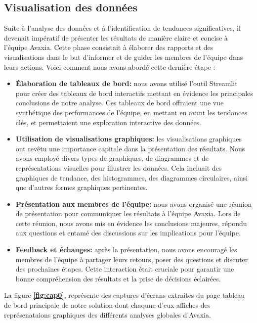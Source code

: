         \subsection{Visualisation des données}
        \par Suite à l'analyse des données et à l'identification de tendances significatives, il devenait impératif de présenter les résultats de manière claire et concise à l'équipe Avaxia. Cette phase consistait à élaborer des rapports et des visualisations dans le but d'informer et de guider les membres de l'équipe dans leurs actions. Voici comment nous avons abordé cette dernière étape :
        \begin{itemize}
            \item \textbf{Élaboration de tableaux de bord:} nous avons utilisé l'outil Streamlit pour créer des tableaux de bord interactifs mettant en évidence les principales conclusions de notre analyse. Ces tableaux de bord offraient une vue synthétique des performances de l'équipe, en mettant en avant les tendances clés, et permettaient une exploration interactive des données.
            \item \textbf{Utilisation de visualisations graphiques: }les visualisations graphiques ont revêtu une importance capitale dans la présentation des résultats. Nous avons employé divers types de graphiques, de diagrammes et de représentations visuelles pour illustrer les données. Cela incluait des graphiques de tendance, des histogrammes, des diagrammes circulaires, ainsi que d'autres formes graphiques pertinentes.
           
        
            \item \textbf{Présentation aux membres de l'équipe:} nous avons organisé une réunion de présentation pour communiquer les résultats à l'équipe Avaxia. Lors de cette réunion, nous avons mis en évidence les conclusions majeures, répondu aux questions et entamé des discussions sur les implications pour l'équipe.
            \item \textbf{Feedback et échanges:} après la présentation, nous avons encouragé les membres de l'équipe à partager leurs retours, poser des questions et discuter des prochaines étapes. Cette interaction était cruciale pour garantir une bonne compréhension des résultats et la prise de décisions éclairées.
        \end{itemize}
        \newpage
         \par La figure \textbf{\ref{fig:cap0}}, représente des captures d'écrans extraites du page tableau de bord principale de notre solution dont chaqune d'eux affiches des représenataions graphiques des différents analyses globales d'Avaxia.

